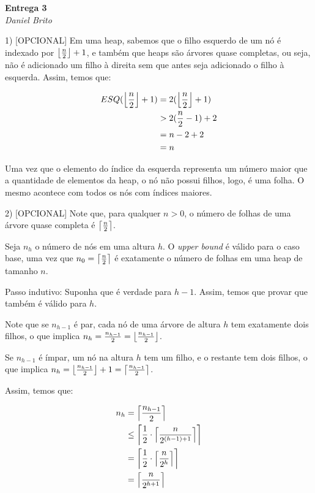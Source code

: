 \documentclass[]{article}
\DeclarePairedDelimiter\ceil{\lceil}{\rceil}
\DeclarePairedDelimiter\floor{\lfloor}{\rfloor}
\begin{document}
\begin{center}
  \Large\textbf{Entrega 3}\\
  \large\textit{Daniel Brito}
\end{center}

1) [OPCIONAL] Em uma heap, sabemos que o filho esquerdo de um nó é indexado por $\floor*{\frac{n}{2}} + 1$, e também que heaps são árvores quase completas, ou seja, não é adicionado um filho à direita sem que antes seja adicionado o filho à esquerda. Assim, temos que:

\begin{align*}
    ESQ(\floor*{\frac{n}{2}} + 1) & = 2(\floor*{\frac{n}{2}} + 1) \\
                                       & > 2(\frac{n}{2} - 1) + 2 \\
                                       & = n - 2 + 2 \\
                                       & = n
\end{align*}

Uma vez que o elemento do índice da esquerda representa um número maior que a quantidade de elementos da heap, o nó não possui filhos, logo, é uma folha. O mesmo acontece com todos os nós com índices maiores.

\newpage

2) [OPCIONAL] Note que, para qualquer $n>0$, o número de folhas de uma árvore quase completa é $\ceil*{\frac{n}{2}}$.

Seja $n_h$ o número de nós em uma altura $h$. O \textit{upper bound} é válido para o caso base, uma vez que $n_0 = \ceil*{\frac{n}{2}}$ é exatamente o número de folhas em uma heap de tamanho $n$.

Passo indutivo: Suponha que é verdade para $h-1$. Assim, temos que provar que também é válido para $h$.

Note que se $n_{h-1}$ é par, cada nó de uma árvore de altura $h$ tem exatamente dois filhos, o que implica $n_h = \frac{n_{h-1}}{2} = \floor*{\frac{n_{h-1}}{2}}$.

Se $n_{h-1}$ é ímpar, um nó na altura $h$ tem um filho, e o restante tem dois filhos, o que implica $n_h = \floor*{\frac{n_{h-1}}{2}} + 1 = \ceil*{\frac{n_{h-1}}{2}}$.

Assim, temos que:

\begin{align*}
    n_h & = \ceil*{\frac{n_{h-1}}{2}} \\
        & \leq \ceil*{\frac{1}{2} \cdot \ceil*{\frac{n}{2^{(h-1)+1}}}} \\
        & = \ceil*{\frac{1}{2} \cdot \ceil*{\frac{n}{2^h}}} \\
        & = \ceil*{\frac{n}{2^{h+1}}}
\end{align*}
\end{document}
